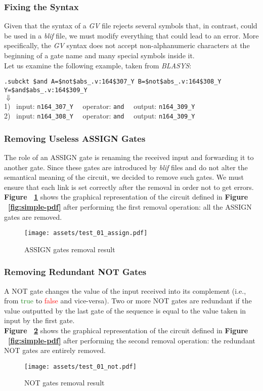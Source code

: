 \documentclass[]{usiinfbachelorproject}
\begin{document}
\subsubsection*{Fixing the Syntax}
Given that the syntax of a \textit{GV} file rejects several symbols that, in contrast, could be used in a \textit{blif} file, we must modify everything that could lead to an error. More specifically, the \textit{GV} syntax does not accept non-alphanumeric characters at the beginning of a gate name and many special symbols inside it. \\
Let us examine the following example, taken from \textit{BLASYS}:
\begin{center}
    \texttt{.subckt \$and A=\$not\$abs\_.v:164\$307\_Y B=\$not\$abs\_.v:164\$308\_Y Y=\$and\$abs\_.v:164\$309\_Y} \\
    $\Downarrow$ \\
    1) \ input: \texttt{n164\_307\_Y} \ \ operator: \texttt{and} \ \ output: \texttt{n164\_309\_Y} \\
    2) \ input: \texttt{n164\_308\_Y} \ \ operator: \texttt{and} \ \ output: \texttt{n164\_309\_Y} \\
\end{center}
\subsubsection*{Removing Useless ASSIGN Gates}
The role of an ASSIGN gate is renaming the received input and forwarding it to another gate. Since these gates are introduced by \textit{blif} files and do not alter the semantical meaning of the circuit, we decided to remove such gates. We must ensure that each link is set correctly after the removal in order not to get errors. \textbf{Figure ~\ref{fig:simple-pdf-1}} shows the graphical representation of the circuit defined in \textbf{Figure ~\ref{fig:simple-pdf}} after performing the first removal operation: all the ASSIGN gates are removed.
\begin{figure}[H]
    \centering
    \texttt{[image: assets/test\_01\_assign.pdf]}
    \caption{ASSIGN gates removal result}
    \label{fig:simple-pdf-1}
\end{figure}
\subsubsection*{Removing Redundant NOT Gates}
A NOT gate changes the value of the input received into its complement (i.e., from \textcolor{ForestGreen}{true} to \textcolor{red}{false} and vice-versa). Two or more NOT gates are redundant if the value outputted by the last gate of the sequence is equal to the value taken in input by the first gate. \\
\textbf{Figure ~\ref{fig:simple-pdf-2}} shows the graphical representation of the circuit defined in \textbf{Figure ~\ref{fig:simple-pdf}} after performing the second removal operation: the redundant NOT gates are entirely removed.
\begin{figure}[H]
    \centering
    \texttt{[image: assets/test\_01\_not.pdf]}
    \caption{NOT gates removal result}
    \label{fig:simple-pdf-2}
\end{figure}
\end{document}
